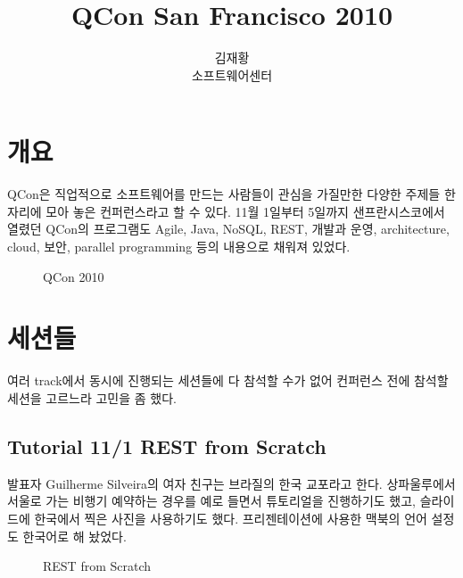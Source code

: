 \documentclass[a4paper]{article}
\title{QCon San Francisco 2010}
\author{김재황 \\ 소프트웨어센터}
\begin{document}
\maketitle

\section{개요}

QCon은 직업적으로 소프트웨어를 만드는 사람들이 관심을 가질만한 
다양한 주제들 한 자리에 모아 놓은 컨퍼런스라고 할 수 있다. 11월 1일부터 5일까지
샌프란시스코에서 열렸던 QCon의 프로그램도 Agile, Java, NoSQL, REST, 
개발과 운영, architecture, cloud, 보안, parallel programming
등의 내용으로 채워져 있었다. 

\begin{figure}[t]
    \begin{Frame}
        \begin{center}
        \end{center}
    \end{Frame}
    \caption{QCon 2010}
    \label{qcon}
\end{figure}

\section{세션들}

여러 track에서 동시에 진행되는 세션들에 다 참석할 수가 없어 컨퍼런스 전에
참석할 세션을 고르느라 고민을 좀 했다.

\subsection{Tutorial 11/1 REST from Scratch}

발표자 Guilherme Silveira의 여자 친구는 브라질의 한국 교포라고 한다.
상파울루에서 서울로 가는 비행기 예약하는 경우를 예로 들면서 튜토리얼을 
진행하기도 했고, 슬라이드에 한국에서 찍은 사진을 사용하기도 했다.
프리젠테이션에 사용한 맥북의 언어 설정도 한국어로 해 놨었다.

\begin{figure}[t]
    \begin{Frame}
        \begin{center}
        \end{center}
    \end{Frame}
    \caption{REST from Scratch}
    \label{REST}
\end{figure}
\end{document}
